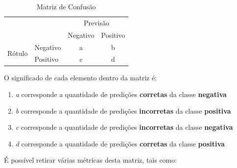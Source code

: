 \begin{table}[h]
\centering
\begin{tabular}{|l|l|c|c|}
\hline
\multicolumn{2}{|l|}{\multirow{2}{*}{}}                  & \multicolumn{2}{c|}{Previsão}                                 \\ \cline{3-4} 
\multicolumn{2}{|l|}{}                                   & \multicolumn{1}{l|}{Negativo} & \multicolumn{1}{l|}{Positivo} \\ \hline
\multicolumn{1}{|c|}{\multirow{2}{*}{Rótulo}} & Negativo & a                             & b                             \\ \cline{2-4} 
\multicolumn{1}{|c|}{}                        & Positivo & c                             & d                             \\ \hline
\end{tabular}
\caption{Matriz de Confusão}
\label{confusion}
\end{table}

O significado de cada elemento dentro da matriz é:
\begin{enumerate}
\item \textit{a} corresponde a quantidade de predições \textbf{corretas} da classe \textbf{negativa}
\item \textit{b} corresponde a quantidade de predições \textbf{incorretas} da classe \textbf{positiva}
\item \textit{c} corresponde a quantidade de predições \textbf{incorretas} da classe \textbf{negativa}
\item \textit{d} corresponde a quantidade de predições \textbf{corretas} da classe \textbf{positiva}
\end{enumerate}

É possível retirar várias métricas desta matriz, tais como:


